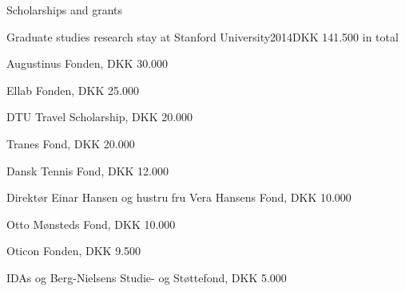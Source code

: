 \documentclass{resume} %
\begin{document}
\begin{rSection}{Scholarships and grants}
    \begin{rSubsection}{Graduate studies research stay at Stanford University}{2014}{DKK 141.500 in total}{}
    \item Augustinus Fonden, DKK 30.000
    \item Ellab Fonden, DKK 25.000
    \item DTU Travel Scholarship, DKK 20.000
    \item Tranes Fond, DKK 20.000
    \item Dansk Tennis Fond, DKK 12.000
    \item Direktør Einar Hansen og hustru fru Vera Hansens Fond, DKK 10.000
    \item Otto Mønsteds Fond, DKK 10.000
    \item Oticon Fonden, DKK 9.500
    \item IDAs og Berg-Nielsens Studie- og Støttefond, DKK 5.000
    \end{rSubsection}
    

\end{rSection}
\end{document}
